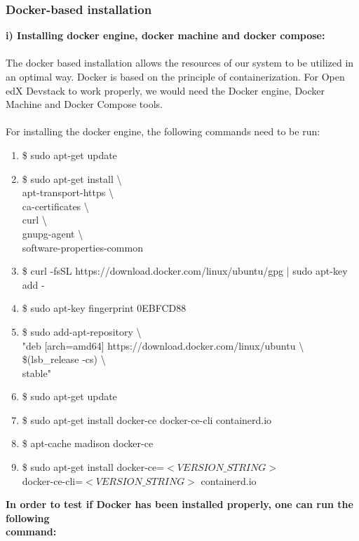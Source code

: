 \documentclass[12pt]{article}
\begin{document}
\subsubsection{Docker-based installation}
\label{sec:dockerinstall}
\textbf{i) Installing docker engine, docker machine and docker compose:}
\\ \\
The docker based installation allows the resources of our system to be utilized in an optimal way. Docker is based on the principle of containerization. For Open edX Devstack to work properly, we would need the Docker engine, Docker Machine and Docker Compose tools.\\ \\
For installing the docker engine, the following commands need to be run:
\begin{enumerate}
	\item \$ sudo apt-get update
	\item \$ sudo apt-get install \textbackslash \\
	apt-transport-https \textbackslash \\
	ca-certificates \textbackslash \\
	curl \textbackslash \\
	gnupg-agent \textbackslash \\
	software-properties-common
	\item \$ curl -fsSL https://download.docker.com/linux/ubuntu/gpg | sudo apt-key add -
	\item \$ sudo apt-key fingerprint 0EBFCD88
	\item \$ sudo add-apt-repository \textbackslash \\
	"deb [arch=amd64] https://download.docker.com/linux/ubuntu \textbackslash \\
	\$(lsb\_release -cs) \textbackslash \\
	stable"
	\item \$ sudo apt-get update
	\item \$ sudo apt-get install docker-ce docker-ce-cli containerd.io
	\item \$ apt-cache madison docker-ce
	\item \$ sudo apt-get install docker-ce=$<VERSION\_STRING>$\\docker-ce-cli=$<VERSION\_STRING>$ containerd.io
\end{enumerate}
\textbf{In order to test if Docker has been installed properly, one can run the following \\command:\\}
\end{document}
